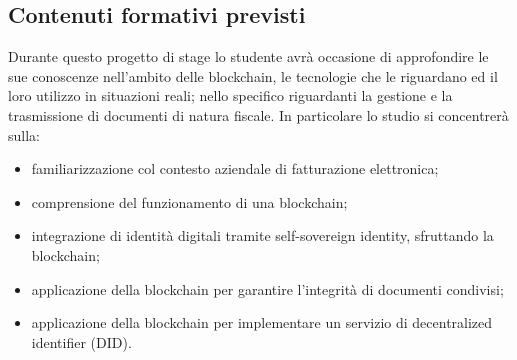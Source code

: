 \subsection{Contenuti formativi previsti}
	Durante questo progetto di stage lo studente avrà occasione di approfondire le sue conoscenze nell'ambito delle blockchain, le tecnologie che le riguardano ed il loro utilizzo in situazioni reali; nello specifico riguardanti la gestione e la trasmissione di documenti di natura fiscale.
	\newline
	In particolare lo studio si concentrerà sulla:
	\begin{itemize}
		\item familiarizzazione col contesto aziendale di fatturazione elettronica;
		\item comprensione del funzionamento di una blockchain;
		\item integrazione di identità digitali tramite self-sovereign identity, sfruttando la blockchain;
		\item applicazione della blockchain per garantire l'integrità di documenti condivisi;
		\item applicazione della blockchain per implementare un servizio di decentralized identifier (DID).
	\end{itemize}
